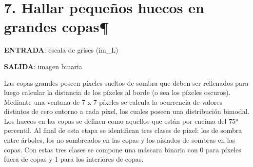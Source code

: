 \documentclass[11pt]{article}
\makeatletter
\newcommand{\boxspacing}{\kern\kvtcb@left@rule\kern\kvtcb@boxsep}
\newcommand{\prompt}[4]{
        \ttfamily\llap{{\color{#2}[#3]:\hspace{3pt}#4}}\vspace{-\baselineskip}
    }
\makeatother
\begin{document}
    \begin{tcolorbox}[breakable, size=fbox, boxrule=1pt, pad at break*=1mm,colback=cellbackground, colframe=cellborder]
\prompt{In}{incolor}{ }{\boxspacing}
\begin{Verbatim}[commandchars=\\\{\}]

\end{Verbatim}
\end{tcolorbox}

    \hypertarget{hallar-pequeuxf1os-huecos-en-grandes-copas}{%
\section{7. Hallar pequeños huecos en grandes
copas¶}\label{hallar-pequeuxf1os-huecos-en-grandes-copas}}

\textbf{ENTRADA}: escala de grises (im\_L)

\textbf{SALIDA}: imagen binaria

Las copas grandes poseen píxeles sueltos de sombra que deben ser
rellenados para luego calcular la distancia de los píxeles al borde (o
sea los píxeles oscuros). Mediante una ventana de 7 x 7 píxeles se
calcula la ocurrencia de valores distintos de cero entorno a cada píxel,
los cuales poseen una distribución bimodal. Los huecos en las copas se
definen como aquellos que están por encima del 75° percentil. Al final
de esta etapa se identifican tres clases de píxel: los de sombra entre
árboles, los no sombreados en las copas y los aislados de sombras en las
copas. Con estas tres clases se compone una máscara binaria con 0 para
píxeles fuera de copas y 1 para los interiores de copas.
\end{document}
